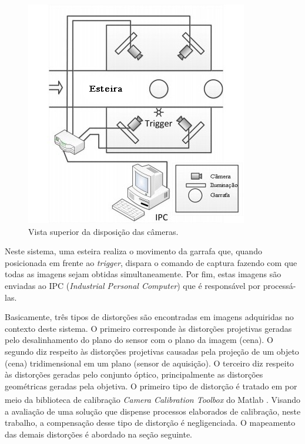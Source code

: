 \begin{figure}[ht]
    \caption{Vista superior da disposição das câmeras.}
    \centering
     \vspace{0.4cm}
    \begin{minipage}{.5\textwidth}
        \includegraphics[width=\linewidth]{TCC/Imagens/cameras.jpg}
	\end{minipage}
    \label{fig:cameras}
\end{figure}


Neste sistema, uma esteira realiza o movimento da garrafa que, quando posicionada em frente ao \textit{trigger}, dispara o comando de captura fazendo com que todas as imagens sejam obtidas simultaneamente. Por fim, estas imagens são enviadas ao IPC (\textit{Industrial Personal Computer}) que é responsável por processá-las.

Basicamente, três tipos de distorções são encontradas em imagens adquiridas no contexto deste sistema. O primeiro corresponde às distorções projetivas geradas pelo desalinhamento do plano do sensor com o plano da imagem (cena). O segundo diz respeito às distorções projetivas causadas pela projeção de um objeto (cena) tridimensional em um plano (sensor de aquisição). O terceiro diz respeito às distorções geradas pelo conjunto óptico, principalmente as distorções geométricas geradas pela objetiva. O primeiro tipo de distorção é tratado em \cite{Lin:2013} por meio da  biblioteca de calibração \textit{Camera Calibration Toolbox} do Matlab\textsuperscript{\tiny\textregistered} \cite{CameraCalibration}. Visando a avaliação de uma solução que dispense processos elaborados de calibração, neste trabalho, a compensação desse tipo de distorção é negligenciada. O mapeamento das demais distorções é abordado na seção seguinte.

